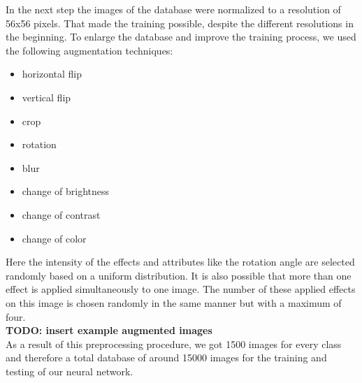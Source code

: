 \documentclass{tubaf-article}
\begin{document}
	In the next step the images of the database were normalized to a resolution of 56x56 pixels. That made the training possible, despite the different resolutions in the beginning. To enlarge the database and improve the training process, we used the following augmentation techniques: \\
	\begin{itemize}
		\item horizontal flip
		\item vertical flip
		\item crop
		\item rotation 
		\item blur
		\item change of brightness
		\item change of contrast
		\item change of color
	\end{itemize}
	Here the intensity of the effects and attributes like the rotation angle are selected randomly based on a uniform distribution. It is also possible that more than one effect is applied simultaneously to one image. The number of these applied effects on this image is chosen randomly in the same manner but with a maximum of four. \\
	\textbf{TODO: insert example augmented images} \\
	As a result of this preprocessing procedure, we got 1500 images for every class and therefore a total database of around 15000 images for the training and testing of our neural network. 
	
	
\end{document}
